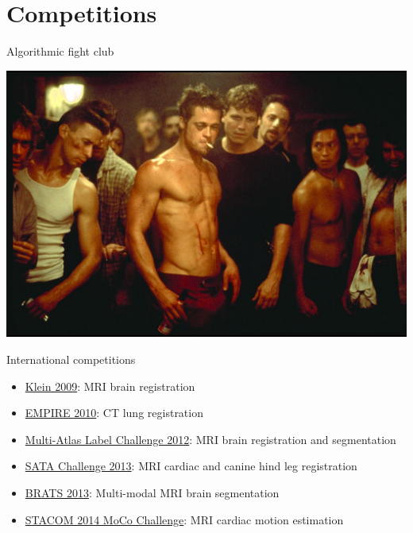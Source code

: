 \documentclass[ignorenonframetext,]{beamer}
\begin{document}
\section{Competitions}\label{competitions}

\begin{frame}{Algorithmic fight club}

\includegraphics{./competitions/figures/fightclub.jpg}

\end{frame}

\begin{frame}{International competitions}

\begin{itemize}
\item
  \href{http://www.ncbi.nlm.nih.gov/pubmed/19195496}{Klein 2009}: MRI
  brain registration
\item
  \href{http://empire10.isi.uu.nl}{EMPIRE 2010}: CT lung registration
\item
  \href{https://masi.vuse.vanderbilt.edu/workshop2012/index.php/Main_Page}{Multi-Atlas
  Label Challenge 2012}: MRI brain registration and segmentation
\item
  \href{https://masi.vuse.vanderbilt.edu/workshop2013/index.php/MICCAI_2013_SATA_Challenge_and_Workshop:Current_events}{SATA
  Challenge 2013}: MRI cardiac and canine hind leg registration
\item
  \href{http://martinos.org/qtim/miccai2013/}{BRATS 2013}: Multi-modal
  MRI brain segmentation
\item
  \href{http://www.cardiacatlas.org/web/stacom2014/moco-introduction}{STACOM
  2014 MoCo Challenge}: MRI cardiac motion estimation
\end{itemize}

\end{frame}
\end{document}
